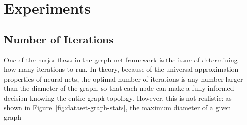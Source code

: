 \section{Experiments}
\label{sec:experiments}

\subsection{Number of Iterations}
One of the major flaws in the graph net framework is the issue of determining how many iterations to run.
In theory, because of the universal approximation properties of neural nets, the optimal number of iterations is any number larger than the diameter of the graph, so that each node can make a fully informed decision knowing the entire graph topology.
However, this is not realistic: as shown in Figure~\ref{fig:dataset-graph-stats}, the maximum diameter of a given graph

